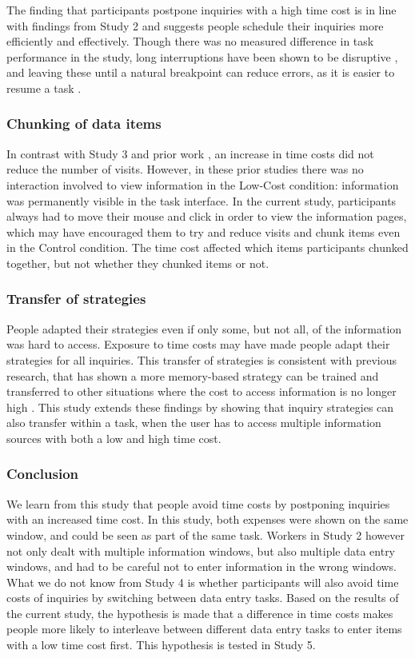 The finding that participants postpone inquiries with a high time cost is in line with findings from Study 2 and suggests people schedule their inquiries more efficiently and effectively. Though there was no measured difference in task performance in the study, long interruptions have been shown to be disruptive \citep{Altmann2017, Monk2008}, and leaving these until a natural breakpoint can reduce errors, as it is easier to resume a task \citep{Gould2013a, Iqbal2005}.

\subsubsection{Chunking of data items}
In contrast with Study 3 and prior work \citep{Gray2006}, an increase in time costs did not reduce the number of visits. However, in these prior studies there was no interaction involved to view information in the Low-Cost condition: information was permanently visible in the task interface. In the current study, participants always had to move their mouse and click in order to view the information pages, which may have encouraged them to try and reduce visits and chunk items even in the Control condition. The time cost affected which items participants chunked together, but not whether they chunked items or not.

\subsubsection{Transfer of strategies}
People adapted their strategies even if only some, but not all, of the information was hard to access. Exposure to time costs may have made people adapt their strategies for all inquiries. This transfer of strategies is consistent with previous research, that has shown a more memory-based strategy can be trained and transferred to other situations where the cost to access information is no longer high \citep{Patrick2014}. This study extends these findings by showing that inquiry strategies can also transfer within a task, when the user has to access multiple information sources with both a low and high time cost.

\subsubsection{Conclusion}
We learn from this study that people avoid time costs by postponing inquiries with an increased time cost. In this study, both expenses were shown on the same window, and could be seen as part of the same task. Workers in Study 2 however not only dealt with multiple information windows, but also multiple data entry windows, and had to be careful not to enter information in the wrong windows. What we do not know from Study 4 is whether participants will also avoid time costs of inquiries by switching between data entry tasks. Based on the results of the current study, the hypothesis is made that a difference in time costs makes people more likely to interleave between different data entry tasks to enter items with a low time cost first. This hypothesis is tested in Study 5.

